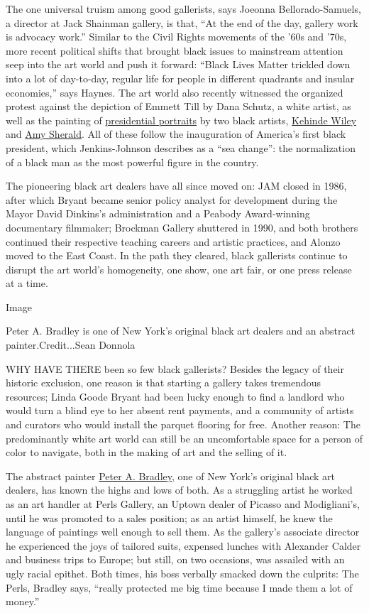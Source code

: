 The one universal truism among good gallerists, says Joeonna
Bellorado-Samuels, a director at Jack Shainman gallery, is that, ``At
the end of the day, gallery work is advocacy work.'' Similar to the
Civil Rights movements of the '60s and '70s, more recent political
shifts that brought black issues to mainstream attention seep into the
art world and push it forward: ``Black Lives Matter trickled down into a
lot of day-to-day, regular life for people in different quadrants and
insular economies,'' says Haynes. The art world also recently witnessed
the organized protest against the depiction of Emmett Till by Dana
Schutz, a white artist, as well as the painting of
\href{https://www.nytimes.com/2018/02/12/arts/design/obama-portrait.html}{presidential
portraits} by two black artists, \href{http://kehindewiley.com/}{Kehinde
Wiley} and \href{http://www.amysherald.com/}{Amy Sherald}. All of these
follow the inauguration of America's first black president, which
Jenkins-Johnson describes as a ``sea change'': the normalization of a
black man as the most powerful figure in the country.

The pioneering black art dealers have all since moved on: JAM closed in
1986, after which Bryant became senior policy analyst for development
during the Mayor David Dinkins's administration and a Peabody
Award-winning documentary filmmaker; Brockman Gallery shuttered in 1990,
and both brothers continued their respective teaching careers and
artistic practices, and Alonzo moved to the East Coast. In the path they
cleared, black gallerists continue to disrupt the art world's
homogeneity, one show, one art fair, or one press release at a time.

Image

Peter A. Bradley is one of New York's original black art dealers and an
abstract painter.Credit...Sean Donnola

WHY HAVE THERE been so few black gallerists? Besides the legacy of their
historic exclusion, one reason is that starting a gallery takes
tremendous resources; Linda Goode Bryant had been lucky enough to find a
landlord who would turn a blind eye to her absent rent payments, and a
community of artists and curators who would install the parquet flooring
for free. Another reason: The predominantly white art world can still be
an uncomfortable space for a person of color to navigate, both in the
making of art and the selling of it.

The abstract painter \href{http://www.peterabradley.com/}{Peter A.
Bradley}, one of New York's original black art dealers, has known the
highs and lows of both. As a struggling artist he worked as an art
handler at Perls Gallery, an Uptown dealer of Picasso and Modigliani's,
until he was promoted to a sales position; as an artist himself, he knew
the language of paintings well enough to sell them. As the gallery's
associate director he experienced the joys of tailored suits, expensed
lunches with Alexander Calder and business trips to Europe; but still,
on two occasions, was assailed with an ugly racial epithet. Both times,
his boss verbally smacked down the culprits: The Perls, Bradley says,
``really protected me big time because I made them a lot of money.''

